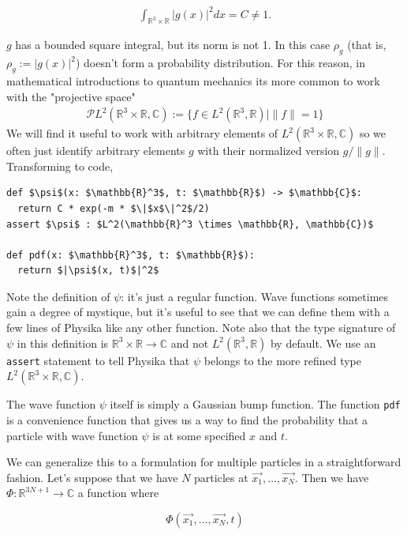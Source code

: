\documentclass[book.tex]{subfiles}
\begin{document}
\begin{align}
    \int_{\mathbb{R}^3 \times \mathbb{R}} |g(x)|^2 dx = C \neq 1.
\end{align}

\noindent $g$ has a bounded square integral, but its norm is not 1. In this case $\rho_g$ (that is, $\rho_g := |g(x)|^2$) doesn't form a probability distribution. For this reason, in mathematical introductions to quantum mechanics its more common to work with the "projective space"
\begin{align}
    \mathcal{P}L^2(\mathbb{R}^3 \times \mathbb{R}, \mathbb{C}) := \{ f \in L^2(\mathbb{R}^3, \mathbb{R})| \|f\| = 1\}
\end{align}
We will find it useful to work with arbitrary elements of $L^2(\mathbb{R}^3 \times \mathbb{R}, \mathbb{C})$ so we often just identify arbitrary elements $g$ with their normalized version $g/\|g\|$. Transforming to code,

\begin{lstlisting}
def $\psi$(x: $\mathbb{R}^3$, t: $\mathbb{R}$) -> $\mathbb{C}$:
  return C * exp(-m * $\|$x$\|^2$/2)
assert $\psi$ : $L^2(\mathbb{R}^3 \times \mathbb{R}, \mathbb{C})$

def pdf(x: $\mathbb{R}^3$, t: $\mathbb{R}$):
  return $|\psi$(x, t)$|^2$
\end{lstlisting}

Note the definition of $\psi$: it's just a regular function. Wave functions sometimes gain a degree of mystique, but it's useful to see that we can define them with a few lines of Physika like any other function. Note also that the type signature of $\psi$ in this definition is $\mathbb{R}^3 \times \mathbb{R} \to \mathbb{C}$ and not $L^2(\mathbb{R}^3, \mathbb{R})$ by default. We use an \lstinline{assert} statement to tell Physika that $\psi$ belongs to the more refined type $L^2(\mathbb{R}^3 \times \mathbb{R}, \mathbb{C})$.

The wave function $\psi$ itself is simply a Gaussian bump function. The function \lstinline{pdf} is a convenience function that gives us a way to find the probability that a particle with wave function $\psi$ is at some specified $x$ and $t$.


We can generalize this to a formulation for multiple particles in a straightforward fashion. Let's suppose that we have $N$ particles at $\vec{x_1}, \dotsc, \vec{x_N}$. Then we have $\Phi: \mathbb{R}^{3N + 1} \to \mathbb{C}$ a function where

\begin{equation} \Phi(\vec{x_1}, \dotsc, \vec{x_N}, t) \end{equation}
\end{document}

